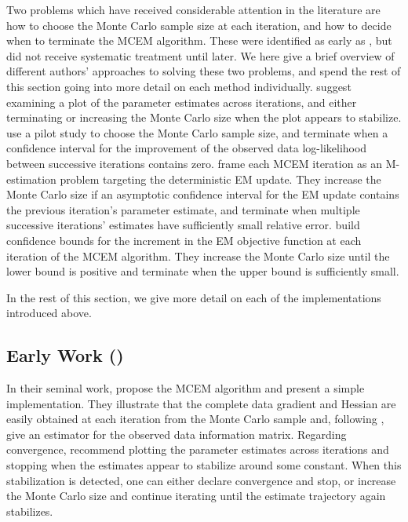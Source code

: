 \documentclass[11pt, oneside]{article}   	%
\begin{document}
Two problems which have received considerable attention in the literature are how to choose the Monte Carlo sample size at each iteration, and how to decide when to terminate the MCEM algorithm. These were identified as early as \citet{Wei90}, but did not receive systematic treatment until later. We here give a brief overview of different authors' approaches to solving these two problems, and spend the rest of this section going into more detail on each method individually. \citet{Wei90} suggest examining a plot of the parameter estimates across iterations, and either terminating or increasing the Monte Carlo size when the plot appears to stabilize. \citet{Cha95} use a pilot study to choose the Monte Carlo sample size, and terminate when a confidence interval for the improvement of the observed data log-likelihood between successive iterations contains zero. \citet{Boo99} frame each MCEM iteration as an M-estimation problem targeting the deterministic EM update. They increase the Monte Carlo size if an asymptotic confidence interval for the EM update contains the previous iteration's parameter estimate, and terminate when multiple successive iterations' estimates have sufficiently small relative error. \citet{Caf05} build confidence bounds for the increment in the EM objective function at each iteration of the MCEM algorithm. They increase the Monte Carlo size until the lower bound is positive and terminate when the upper bound is sufficiently small.

In the rest of this section, we give more detail on each of the implementations introduced above.

\subsection{Early Work (\citealp{Wei90})}

In their seminal work, \citet{Wei90} propose the MCEM algorithm and present a simple implementation. They illustrate that the complete data gradient and Hessian are easily obtained at each iteration from the Monte Carlo sample and, following \citet{Lou82}, give an estimator for the observed data information matrix. Regarding convergence, \citeauthor{Wei90} recommend plotting the parameter estimates across iterations and stopping when the estimates appear to stabilize around some constant. When this stabilization is detected, one can either declare convergence and stop, or increase the Monte Carlo size and continue iterating until the estimate trajectory again stabilizes.
\end{document}
